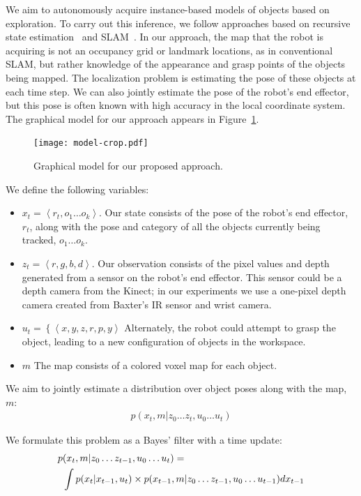We aim to autonomously acquire instance-based models of objects based
on exploration.  To carry out this inference, we follow approaches
based on recursive state estimation~\citep{thrun08} and
SLAM~\citep{durrant06}.  In our approach, the map that the robot is
acquiring is not an occupancy grid or landmark locations, as in
conventional SLAM, but rather knowledge of the appearance and grasp
points of the objects being mapped.  The localization problem is
estimating the pose of these objects at each time step.  We can also
jointly estimate the pose of the robot's end effector, but this pose
is often known with high accuracy in the local coordinate system.  The
graphical model for our approach appears in Figure~\ref{fig:model}.

\begin{figure}
\centering
\texttt{[image: model-crop.pdf]}
\caption{Graphical model for our proposed approach.\label{fig:model}}
\end{figure}

We define the following variables:
\begin{itemize}
\item $x_t = \left< r_t, o_1 \dots o_k \right>$.  Our state consists of
  the pose of the robot's end effector, $r_t$, along with the pose and
  category of all the objects currently being tracked, $o_1 \dots o_k$.
\item $z_t = \left<r, g, b, d\right>$.  Our observation consists of
  the pixel values and depth generated from a sensor on the robot's
  end effector.  This sensor could be a depth camera from the Kinect;
  in our experiments we use a one-pixel depth camera created from
  Baxter's IR sensor and wrist camera.
\item $u_t = \left\{\left<x, y, z, r, p, y\right>\right.$ Alternately,
  the robot could attempt to grasp the object, leading to a new
  configuration of objects in the workspace.
\item $m$ The map consists of a colored voxel map for each object. 
\end{itemize}

We aim to jointly estimate a distribution over object poses along with
the map, $m$:
\begin{align}
p(x_t, m |  z_0 \dots z_t, u_0 \dots u_t)
\end{align}

We formulate this problem as a Bayes' filter with a time update:
\begin{align}
p&(x_t, m | z_0 \dots z_{t-1}, u_0 \dots u_t) = \notag\\
&\int p(x_t | x_{t-1}, u_t) \times p(x_{t-1}, m | z_{0} \dots z_{t-1}, u_{0} \dots u_{t-1}) dx_{t-1}
\end{align}

